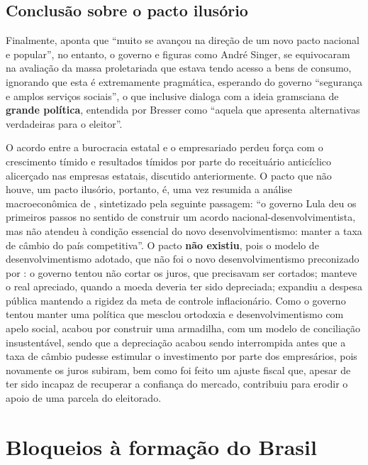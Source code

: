 	\section{Conclusão sobre o pacto ilusório}
	
	Finalmente,  aponta que ``muito se avançou na direção de um novo pacto nacional e popular'', no entanto, o governo e figuras como André Singer, se equivocaram na avaliação da massa proletariada que estava tendo acesso a bens de consumo, ignorando que esta é extremamente pragmática, esperando do governo ``segurança e amplos serviços sociais'', o que inclusive dialoga com a ideia gramsciana de \textbf{grande política}, entendida por Bresser como ``aquela que apresenta alternativas verdadeiras para o eleitor''.
	
	O acordo entre a burocracia estatal e o empresariado perdeu força \cite[p. 368]{Bresser2016} com o crescimento tímido e resultados tímidos por parte do receituário anticíclico alicerçado nas empresas estatais, discutido anteriormente. O pacto que não houve, um pacto ilusório, portanto, é, uma vez resumida a análise macroeconômica de , sintetizado pela seguinte passagem: ``o governo Lula deu os primeiros passos no sentido de construir um acordo nacional-desenvolvimentista, mas não atendeu à condição essencial do novo desenvolvimentismo: manter a taxa de câmbio do país competitiva''. O pacto \textbf{não existiu}, pois o modelo de desenvolvimentismo adotado, que não foi o novo desenvolvimentismo preconizado por : o governo tentou não cortar os juros, que precisavam ser cortados; manteve o real apreciado, quando a moeda deveria ter sido depreciada; expandiu a despesa pública mantendo a rigidez da meta de controle inflacionário. Como o governo tentou manter uma política que mesclou ortodoxia e desenvolvimentismo com apelo social, acabou por construir uma armadilha, com um modelo de conciliação insustentável, sendo que a depreciação acabou sendo interrompida antes que a taxa de câmbio pudesse estimular o investimento por parte dos empresários, pois novamente os juros subiram, bem como foi feito um ajuste fiscal que, apesar de ter sido incapaz de recuperar a confiança do mercado, contribuiu para erodir o apoio de uma parcela do eleitorado.
	
	\chapter{Bloqueios à formação do Brasil}
	
